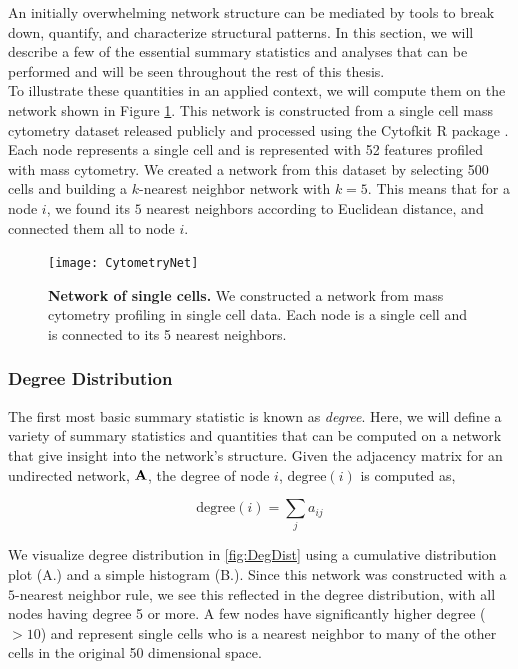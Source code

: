 \indent An initially overwhelming network structure can be mediated by tools to break down, quantify, and characterize structural patterns. In this section, we will describe a few of the essential summary statistics and analyses that can be performed and will be seen throughout the rest of this thesis.\\

\indent To illustrate these quantities in an applied context, we will compute them on the network shown in Figure \ref{fig:Cytometry}. This network is constructed from a single cell mass cytometry dataset released publicly and processed using the Cytofkit R package \cite{cytofkit}. Each node represents a single cell and is represented with 52 features profiled with mass cytometry. We created a network from this dataset by selecting 500 cells and building a $k$-nearest neighbor network with $k=5$. This means that for a node $i$, we found its $5$ nearest neighbors according to Euclidean distance, and connected them all to node $i$. 

\begin{figure}
\begin{center}
\texttt{[image: CytometryNet]}
\caption{{\bf Network of single cells.} We constructed a network from mass cytometry profiling in single cell data. Each node is a single cell and is connected to its 5 nearest neighbors.}
\label{fig:Cytometry}
\end{center}
\end{figure}

\subsubsection{Degree Distribution}

The first most basic summary statistic is known as \emph{degree}. Here, we will define a variety of summary statistics and quantities that can be computed on a network that give insight into the network's structure. Given the adjacency matrix for an undirected network, ${\bf A}$, the degree of node $i$, $\text{degree}(i)$ is computed as,

\begin{equation}
\text{degree}(i)=\sum_{j}a_{ij}
\end{equation}

We visualize degree distribution in \ref{fig:DegDist} using a cumulative distribution plot (A.) and a simple histogram (B.). Since this network was constructed with a $5$-nearest neighbor rule, we see this reflected in the degree distribution, with all nodes having degree 5 or more. A few nodes have significantly higher degree ($> 10$) and represent single cells who is a nearest neighbor to many of the other cells in the original 50 dimensional space. 

